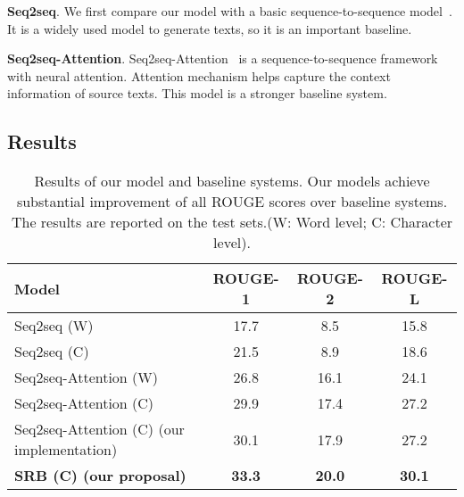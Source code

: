 \documentclass{clv3}
\begin{document}
\begin{CJK*}{UTF8}{gbsn}
\noindent\textbf{Seq2seq}. We first compare our model with a basic sequence-to-sequence model~\cite{seq2seq}. It is a widely used model to generate texts, so it is an important baseline.

\noindent\textbf{Seq2seq-Attention}. Seq2seq-Attention~\cite{attention} is a sequence-to-sequence framework with neural attention. Attention mechanism helps capture the context information of source texts. This model is a stronger baseline system.

\subsection{Results}


\begin{table}[tb]
	\centering
	\caption{Results of our model and baseline systems. Our models achieve substantial improvement of all ROUGE scores over baseline systems. The results are reported on the test sets.(W: Word level; C: Character level).} \label{tab2}
	\newcommand{\tabincell}[2]{\begin{tabular}{@{}#1@{}}#2\end{tabular}}
	\begin{tabular}{|l|c|c|c|}
		\hline
		Model  & ROUGE-1 & ROUGE-2 & ROUGE-L \\
		\hline
		Seq2seq (W)~\cite{lcsts}  &     17.7  & 8.5  &  15.8 \\
		Seq2seq (C)~\cite{lcsts}  &       21.5  & 8.9  &  18.6  \\
		Seq2seq-Attention (W)~\cite{lcsts} & 26.8  & 16.1  &  24.1  \\
		Seq2seq-Attention (C)~\cite{lcsts} & 29.9 & 17.4  &  27.2  \\
		\hline
		Seq2seq-Attention (C) (our implementation) & 30.1  & 17.9  & 27.2  \\
		\textbf{SRB (C) (our proposal)} & \textbf{33.3}   & \textbf{20.0}  & \textbf{30.1} \\
		\hline
	\end{tabular}
\end{table}



\end{CJK*}
\end{document}
